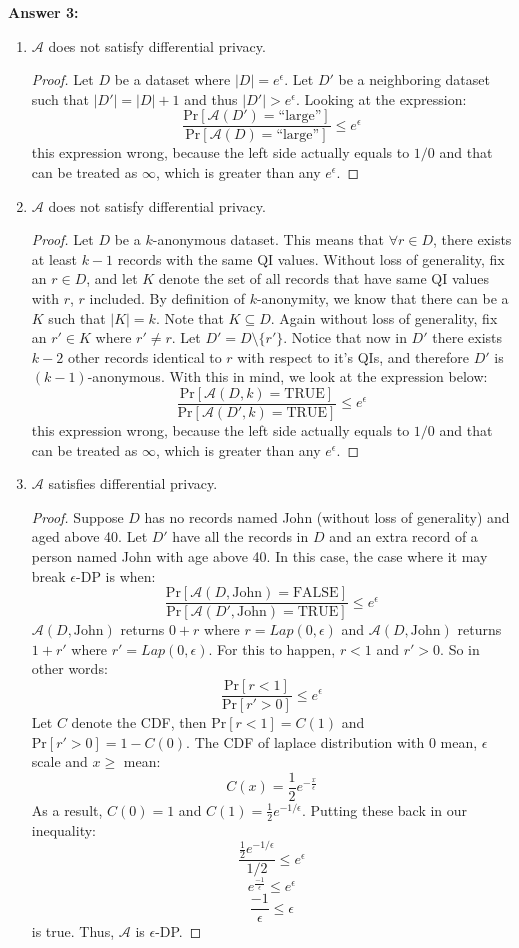 \documentclass[12pt,reqno]{amsart}
\newcommand{\pr}[0]{\text{Pr}}
\newcommand{\advrs}[0]{\mathcal{A}}
\begin{document}
\newpage
\textbf{Answer 3:}
\begin{enumerate}[label=(\alph*)]
\item $\advrs$ does not satisfy differential privacy.
	\begin{proof}
	 Let $D$ be a dataset where $|D| = e^\epsilon$. Let $D'$ be a neighboring dataset such that $|D'|=|D|+1$ and thus $|D'| > e^\epsilon$. Looking at the expression:
$$
\frac{\pr[\advrs(D')=\textrm{``large''}]}{\pr[\advrs(D)=\textrm{``large''}]} \leq e^\epsilon
$$
this expression wrong, because the left side actually equals to $1/0$ and that can be treated as $\infty$, which is greater than any $e^\epsilon$.
	\end{proof}
\item $\advrs$ does not satisfy differential privacy.
	\begin{proof}
	 Let $D$ be a $k$-anonymous dataset. This means that $\forall r \in D$, there exists at least $k-1$ records with the same QI values. Without loss of generality, fix an $r \in D$, and let $K$ denote the set of all records that have same QI values with $r$, $r$ included. By definition of $k$-anonymity, we know that there can be a $K$ such that $|K|=k$. Note that $K \subseteq D$. Again without loss of generality, fix an $r' \in K$ where $r' \neq r$. Let $D' = D \setminus \{r'\}$. Notice that now in $D'$ there exists $k-2$ other records identical to $r$ with respect to it's QIs, and therefore $D'$ is $(k-1)$-anonymous. With this in mind, we look at the expression below:
	 $$
\frac{\pr[\advrs(D,k)=\textrm{TRUE}]}{\pr[\advrs(D',k)=\textrm{TRUE}]} \leq e^\epsilon
$$
this expression wrong, because the left side actually equals to $1/0$ and that can be treated as $\infty$, which is greater than any $e^\epsilon$.
	\end{proof}
\item $\advrs$ satisfies differential privacy.
	\begin{proof}
	Suppose $D$ has no records named John (without loss of generality) and aged above 40. Let $D'$ have all the records in $D$ and an extra record of a person named John with age above 40. In this case, the case where it may break $\epsilon$-DP is when:
	$$
\frac{\pr[\advrs(D, \textrm{John})=\textrm{FALSE}]}{\pr[\advrs(D', \textrm{John})=\textrm{TRUE}]} \leq e^{\epsilon}
$$
$\advrs(D, \textrm{John})$ returns $0+r$ where $r=Lap(0, \epsilon)$ and $\advrs(D, \textrm{John})$ returns $1 + r'$ where $r' = Lap(0, \epsilon)$. For this to happen, $r < 1$ and $r' > 0$. So in other words:
	$$
\frac{\pr[r < 1]}{\pr[r' > 0]} \leq e^{\epsilon}
$$
Let $C$ denote the CDF, then $\pr[r < 1] = C(1)$ and $\pr[r' > 0] = 1 - C(0)$. The CDF of laplace distribution with 0 mean, $\epsilon$ scale and $x \geq$ mean:
$$
C(x) = \frac{1}{2}e^{-\frac{x}{\epsilon}}
$$
As a result, $C(0)=1$ and $C(1)=\frac{1}{2}e^{-1/\epsilon}$. Putting these back in our inequality:
	$$
\frac{\frac{1}{2}e^{-1/\epsilon}}{1/2} \leq e^{\epsilon}
$$
$$
e^{\frac{-1}{\epsilon}} \leq e^{\epsilon}
$$
$$
\frac{-1}{\epsilon} \leq \epsilon
$$
is true. Thus, $\advrs$ is $\epsilon$-DP.
	\end{proof}
\end{enumerate}
\end{document}
